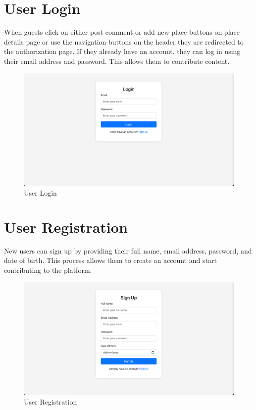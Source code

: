 \section{User Login}
When guests click on either post comment or add new place buttons on place details page or use the navigation buttons on the header they are redirected to the authorization page. If they already have an account, they can log in using their email address and password. This allows them to contribute content.

\begin{figure}[H]
    \centering
    \includegraphics[width=\textwidth]{login.png}
    \caption{User Login}
    \label{fig:login}
\end{figure}

\section{User Registration}
New users can sign up by providing their full name, email address, password, and date of birth. This process allows them to create an account and start contributing to the platform.

\begin{figure}[H]
    \centering
    \includegraphics[width=\textwidth]{signup.png}
    \caption{User Registration}
    \label{fig:signup}
\end{figure}

